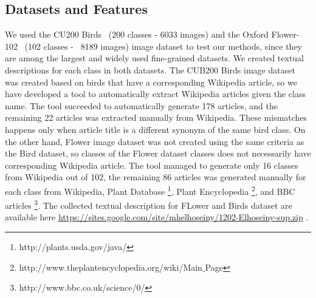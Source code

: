 

\subsection{Datasets and Features}
\label{ss_ds_feats}
We used  the CU200 Birds~\cite{CU20010} (200 classes - 6033 images) and the Oxford Flower-102~\cite{Flower08} (102 classes - ~8189 images) image dataset to test our methods, since they are among the largest and widely used fine-grained datasets.  We created  textual descriptions for each class in both datasets. The CUB200 Birds image dataset was created based on birds that have a corresponding Wikipedia article, so we have developed a tool to automatically extract Wikipedia articles given the class name. The tool succeeded to automatically generate 178 articles, and the remaining 22 articles was extracted manually from Wikipedia. These mismatches happens only when article title is a different synonym of the same bird class. On the other hand, Flower image dataset was not created using the same criteria as the Bird dataset, so classes of the Flower dataset classes does not necessarily have corresponding Wikipedia article. The tool managed to generate only 16 classes from Wikipedia out of 102, the remaining 86 articles was generated manually for each class from Wikipedia, Plant Database  \footnote{http://plants.usda.gov/java/}, Plant Encyclopedia \footnote{http://www.theplantencyclopedia.org/wiki/Main$\_$Page}, and BBC articles \footnote{http://www.bbc.co.uk/science/0/}. The collected textual description for FLower and Birds dataset are available here  \url{https://sites.google.com/site/mhelhoseiny/1202-Elhoseiny-sup.zip} .

